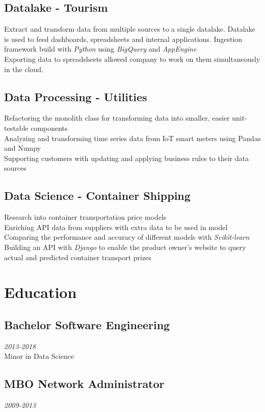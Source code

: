 \documentclass{article}
\begin{document}
\subsection{Datalake - Tourism}
Extract and transform data from multiple sources to a single datalake. Datalake is used to feed dashboards, spreadsheets and internal applications. Ingestion framework build with \emph{Python} using \emph{BigQuery} and \emph{AppEngine} \\
Exporting data to spreadsheets allowed company to work on them simultaneously in the cloud. \\ 

\subsection{Data Processing - Utilities}
Refactoring the monolith class for transforming data into smaller, easier unit-testable components \\
Analyzing and transforming time series data from IoT smart meters using Pandas and Numpy \\
Supporting customers with updating and applying business rules to their data sources \\

\subsection{Data Science - Container Shipping}
Research into container transportation price models \\
Enriching API data from suppliers with extra data to be used in model \\
Comparing the performance and accuracy of different models with \emph{Scikit-learn} \\
Building an API with \emph{Django} to enable the product owner's website to query actual and predicted container transport prizes \\

\clearpage

\section{Education}
\subsection{Bachelor Software Engineering}\hfill {\em 2013-2018} \\
Minor in Data Science
\subsection{MBO Network Administrator}\hfill {\em 2009-2013} \\
\end{document}
